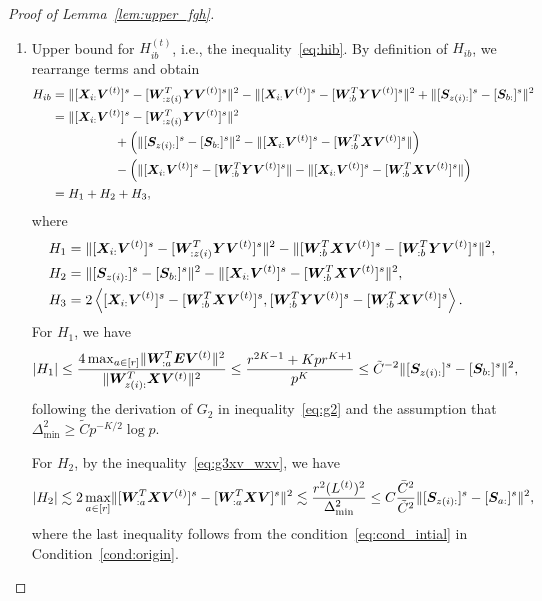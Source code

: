 \documentclass[lettersize,onecolumn,journal]{IEEEtran}
\theoremstyle{definition}
\theoremstyle{definition}
\newcommand{\of}[1]{\left(#1\right)}
\newcommand{\ang}[1]{\left\langle#1\right\rangle}
\begin{document}
\begin{proof}[Proof of Lemma~\ref{lem:upper_fgh}]
\begin{enumerate}[wide]
    \item Upper bound for $H_{ib}^{(t)}$, i.e., the inequality~\eqref{eq:hib}. By definition of $H_{ib}$, we rearrange terms and obtain
    \begin{align}
        H_{ib} &= \onormSize{}{ [\mX_{i:} \mV^{(t)}]^s -  [  \mW_{:z(i)}^T \mY \mV^{(t)} ]^s}^2 - \onormSize{}{ [\mX_{i:} \mV^{(t)}]^s -  [  \mW_{:b}^T \mY \mV^{(t)} ]^s}^2 + \onormSize{}{ [ \mS_{z(i):}  ]^s - [ \mS_{b:}  ]^s  }^2 \\
        & =  \onormSize{}{ [ \mX_{i:} \mV^{(t)}]^s -  [  \mW_{:z(i)}^T \mY \mV^{(t)} ]^s}^2 \\
        & \quad \quad \quad \quad \quad + \of{ \onormSize{}{ [ \mS_{z(i):}  ]^s - [ \mS_{b:}  ]^s  }^2 - \onormSize{}{ [\mX_{i:} \mV^{(t)}]^s-  [  \mW_{:b}^T \mX \mV^{(t)} ]^s }  } \\
        & \quad \quad \quad \quad \quad  - \of{\onormSize{}{ [\mX_{i:} \mV^{(t)}]^s-  [  \mW_{:b}^T \mY \mV^{(t)} ]^s } -  \onormSize{}{ [\mX_{i:} \mV^{(t)}]^s-  [  \mW_{:b}^T \mX \mV^{(t)} ]^s }   } \\
        & = H_1 + H_2 + H_3,
    \end{align}
    where 
    \begin{align}
        H_1 &= \onormSize{}{ [ \mX_{i:} \mV^{(t)}]^s -  [  \mW_{:z(i)}^T \mY \mV^{(t)} ]^s}^2 - \onormSize{}{ [ \mW_{:b}^T \mX \mV^{(t)}]^s -  [ \mW_{:b}^T \mY \mV^{(t)}]^s}^2, \\
        H_2 &=  \onormSize{}{ [ \mS_{z(i):}  ]^s - [ \mS_{b:}  ]^s  }^2 - \onormSize{}{ [\mX_{i:} \mV^{(t)}]^s-  [  \mW_{:b}^T \mX \mV^{(t)} ]^s }^2  , \\
        H_3 & = 2 \ang{  [\mX_{i:} \mV^{(t)}]^s  -  [  \mW_{:b}^T \mX \mV^{(t)} ]^s,  [  \mW_{:b}^T \mY \mV^{(t)} ]^s -  [  \mW_{:b}^T \mX \mV^{(t)} ]^s }.
    \end{align}
    For $H_1$, we have 
    \begin{align}
        |H_1| \leq  \frac{4 \max_{a \in [r]}\onormSize{}{ \mW_{:a}^T \mE \mV^{(t)} }^2 }{ \onormSize{}{ \mW_{z(i):}^T\mX \mV^{(t)}}^2}
         \leq  \frac{ r^{2K-1} + K p r^{K+1} }{p^{K}} 
        \leq \tilde C^{-2} \onormSize{}{ [ \mS_{z(i):}  ]^s - [ \mS_{b:}  ]^s  }^2\label{eq:h1},
    \end{align}
    following the derivation of $G_2$ in inequality~\eqref{eq:g2} and the assumption that $\Delta_{\min}^2 \geq \tilde C p^{-K/2} \log p$.

    For $H_2$, by the inequality~\eqref{eq:g3xv_wxv}, we have 
    \begin{equation}\label{eq:h2}
        |H_2| \lesssim 2\max_{a \in [r]}\onormSize{}{[\mW_{:a}^T\mX \mV^{(t)}]^s - [\mW_{:a}^T\mX \mV]^s }^2 \lesssim \frac{r^2 (L^{(t)})^2}{\Delta_{\min}^2} \leq C \frac{\bar C^2}{ \tilde C^2} \onormSize{}{ [ \mS_{z(i):} ]^s - [ \mS_{a:}]^s }^2,
    \end{equation}
    where the last inequality follows from the condition~\eqref{eq:cond_intial} in Condition~\ref{cond:origin}.
    

\end{enumerate}
\end{proof}
\end{document}
